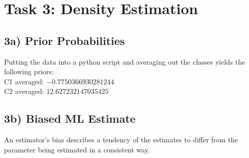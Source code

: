 \documentclass{article}
\begin{document}
\section{Task 3: Density Estimation}
\subsection{3a) Prior Probabilities}
Putting the data into a python script and averaging out the classes yields the following priors: \\
C1 averaged: $-0.7750366930281244$ \\
C2 averaged: $12.627232147035425$

\subsection{3b) Biased ML Estimate}
An estimator's bias describes a tendency of the estimates to differ from the parameter being estimated in a consistent way.
\end{document}
